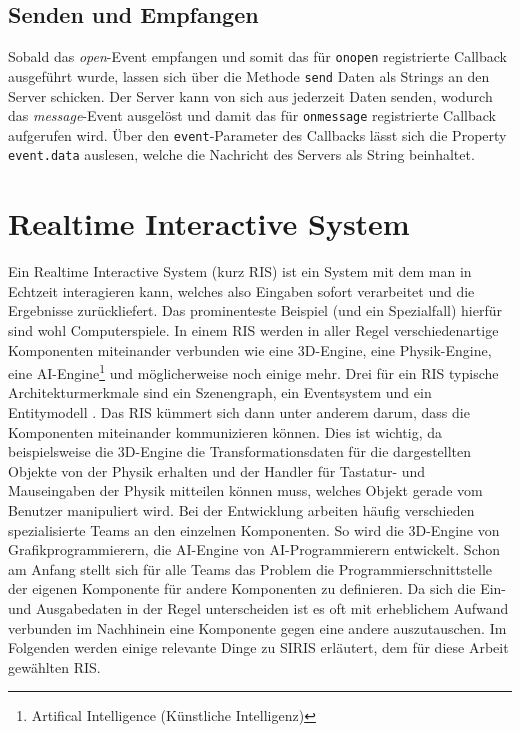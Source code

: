 \subsection{Senden und Empfangen}
Sobald das \textit{open}-Event empfangen und somit das für \texttt{onopen} registrierte Callback ausgeführt wurde, lassen sich über die Methode \texttt{send} Daten als Strings an den Server schicken. Der Server kann von sich aus jederzeit Daten senden, wodurch das \textit{message}-Event ausgelöst und damit das für \texttt{onmessage} registrierte Callback aufgerufen wird. Über den \texttt{event}-Parameter des Callbacks lässt sich die Property \texttt{event.data} auslesen, welche die Nachricht des Servers als String beinhaltet.

\section{Realtime Interactive System}
\label{sec:ris}
Ein Realtime Interactive System (kurz RIS) ist ein System mit dem man in Echtzeit interagieren kann, welches also Eingaben sofort verarbeitet und die Ergebnisse zurückliefert. Das prominenteste Beispiel (und ein Spezialfall) hierfür sind wohl Computerspiele. In einem RIS werden in aller Regel verschiedenartige Komponenten miteinander verbunden wie eine 3D-Engine, eine Physik-Engine, eine AI-Engine\footnote{Artifical Intelligence (Künstliche Intelligenz)} und möglicherweise noch einige mehr. Drei für ein RIS typische Architekturmerkmale sind ein Szenengraph, ein Eventsystem und ein Entitymodell \autocite[299]{GuruMeditation}. Das RIS kümmert sich dann unter anderem darum, dass die Komponenten miteinander kommunizieren können. Dies ist wichtig, da beispielsweise die 3D-Engine die Transformationsdaten für die dargestellten Objekte von der Physik erhalten und der Handler für Tastatur- und Mauseingaben der Physik mitteilen können muss, welches Objekt gerade vom Benutzer manipuliert wird. Bei der Entwicklung arbeiten häufig verschieden spezialisierte Teams an den einzelnen Komponenten. So wird die 3D-Engine von Grafikprogrammierern, die AI-Engine von AI-Programmierern entwickelt. Schon am Anfang stellt sich für alle Teams das Problem die Programmierschnittstelle der eigenen Komponente für andere Komponenten zu definieren. Da sich die Ein- und Ausgabedaten in der Regel unterscheiden ist es oft mit erheblichem Aufwand verbunden im Nachhinein eine Komponente gegen eine andere auszutauschen. Im Folgenden werden einige relevante Dinge zu SIRIS erläutert, dem für diese Arbeit gewählten RIS.

